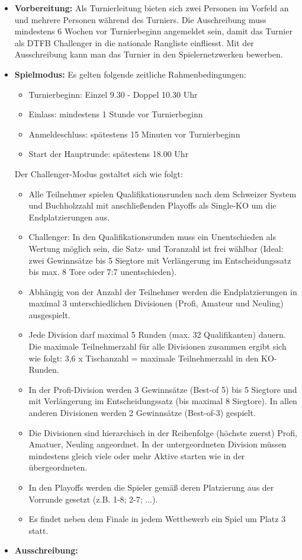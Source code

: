 \begin{itemize}
\item \textbf{Vorbereitung:} 
Als Turnierleitung bieten sich zwei Personen im Vorfeld an und mehrere Personen während des Turniers.
Die Auschreibung muss mindestens 6 Wochen vor Turnierbeginn angemeldet sein, damit das Turnier als DTFB Challenger in die nationale Rangliste einfliesst. Mit der Ausschreibung kann man das Turnier in den Spielernetzwerken bewerben.   
\item \textbf{Spielmodus:}
Es gelten folgende zeitliche Rahmenbedingungen: 
\begin{itemize}
\item Turnierbeginn: Einzel 9.30 - Doppel 10.30 Uhr
\item Einlass: mindestens 1 Stunde vor Turnierbeginn
\item Anmeldeschluss: spätestens 15 Minuten vor Turnierbeginn 
\item Start der Hauptrunde: spätestens 18.00 Uhr
\end{itemize}
Der Challenger-Modus gestaltet sich wie folgt:
\begin{itemize}
\item Alle Teilnehmer spielen Qualifikationsrunden nach dem Schweizer System und Buchholzzahl mit anschließenden Playoffs als Single-KO um die Endplatzierungen aus.
\item Challenger: In den Qualifikationsrunden muss ein Unentschieden als Wertung möglich sein, die Satz- und Toranzahl ist frei wählbar (Ideal: zwei Gewinnsätze bis 5 Siegtore mit Verlängerung im Entscheidungssatz bis max. 8 Tore oder 7:7 unentschieden). 
\item Abhängig von der Anzahl der Teilnehmer werden die Endplatzierungen in maximal 3 unterschiedlichen Divisionen (Profi, Amateur und Neuling) ausgespielt. 
\item Jede Division darf maximal 5 Runden (max. 32 Qualifikanten) dauern. Die maximale Teilnehmerzahl für alle Divisionen zusammen ergibt sich wie folgt: 3,6 x Tischanzahl = maximale Teilnehmerzahl in den KO-Runden.
\item In der Profi-Division werden 3 Gewinnsätze (Best-of 5) bis 5 Siegtore und mit Verlängerung im Entscheidungssatz (bis maximal 8 Siegtore). In allen anderen Divisionen werden 2 Gewinnsätze (Best-of-3) gespielt. 
\item Die Divisionen sind hierarchisch in der Reihenfolge (höchste zuerst) Profi, Amatuer, Neuling angeordnet. In der untergeordneten Division müssen mindestens gleich viele oder mehr Aktive starten wie in der übergeordneten.
\item In den Playoffs werden die Spieler gemäß deren Platzierung aus der Vorrunde gesetzt (z.B. 1-8; 2-7; ...).
\item Es findet neben dem Finale in jedem Wettbewerb ein Spiel um Platz 3 statt.
\end{itemize}
\item \textbf{Ausschreibung:}


\end{itemize}
